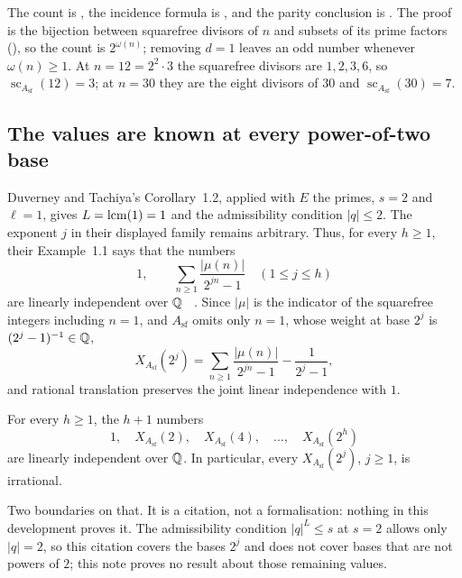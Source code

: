 \documentclass[11pt]{article}
\newcommand{\scA}{\operatorname{sc}}
\newcommand{\Asf}{A_{\mathrm{sf}}}
\begin{document}
\noindent The count is
,
the incidence formula is
,
and the parity conclusion is
.
The proof is the bijection between squarefree divisors of $n$ and subsets of
its prime factors
(),
so the count is $2^{\omega(n)}$; removing $d=1$ leaves an odd number whenever
$\omega(n)\ge1$.  At $n=12=2^2\cdot3$ the squarefree divisors are $1,2,3,6$, so
$\scA_{\Asf}(12)=3$; at $n=30$ they are the eight divisors of $30$ and
$\scA_{\Asf}(30)=7$.

\subsection{The values are known at every power-of-two base}

Duverney and Tachiya's Corollary~1.2, applied with $E$ the primes, $s=2$ and
$\ell=1$, gives $L=\operatorname{lcm}(1)=1$ and the admissibility condition $|q|\le2$.
The exponent \(j\) in their displayed family remains arbitrary.  Thus, for
every \(h\ge1\), their Example~1.1 says that the numbers
\[
  1,\qquad
  \sum_{n\ge1}\frac{|\mu(n)|}{2^{jn}-1}\quad(1\le j\le h)
\]
are linearly independent over $\mathbb{Q}$
~\cite[Cor.~1.2 and Ex.~1.1, author-preprint p.~4]{duverneytachiya}.  Since
$|\mu|$ is the indicator of the squarefree integers including $n=1$, and
$\Asf$ omits only $n=1$, whose weight at base \(2^j\) is
\((2^j-1)^{-1}\in\mathbb{Q}\),
\[
  X_{\Asf}(2^j)
  =\sum_{n\ge1}\frac{|\mu(n)|}{2^{jn}-1}-\frac1{2^j-1},
\]
and rational translation preserves the joint linear independence with \(1\).

\begin{corollary}\label{res:sfsettled}
For every \(h\ge1\), the \(h+1\) numbers
\[
  1,\quad X_{\Asf}(2),\quad X_{\Asf}(4),\quad\ldots,\quad X_{\Asf}(2^h)
\]
are linearly independent over \(\mathbb{Q}\).  In particular, every
\(X_{\Asf}(2^j)\), \(j\ge1\), is irrational.
\end{corollary}

\noindent Two boundaries on that.  It is a citation, not a formalisation:
nothing in this development proves it.  The admissibility condition
$|q|^L\le s$ at \(s=2\) allows only \(|q|=2\), so this citation covers the
bases \(2^j\) and does not cover bases that are not powers of \(2\); this note
proves no result about those remaining values.
\end{document}
